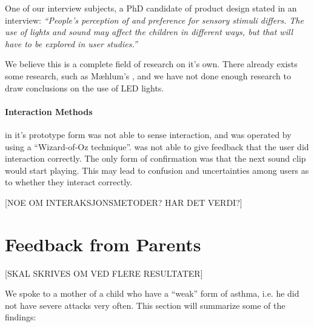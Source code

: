 One of our interview subjects, a PhD candidate of product design stated in an interview: 
\textit{``People's perception of and preference for sensory stimuli differs. The use of lights and sound may affect the children in different ways, but that will have to be explored in user studies.''} 

We believe this is a complete field of research on it's own. There already exists some research, such as M\ae hlum's \iref{}, and we have not done enough research to draw conclusions on the use of LED lights. 


\paragraph{Interaction Methods}
\buddy{} in it's prototype form was not able to sense interaction, and was operated by using a ``Wizard-of-Oz technique''\cite{wilson1988rapid}. \buddy{} was not able to give feedback that the user did interaction correctly. The only form of confirmation was that the next sound clip would start playing. This may lead to confusion and uncertainties among users as to whether they interact correctly. \iref{}

[NOE OM INTERAKSJONSMETODER? HAR DET VERDI?]

\section{Feedback from Parents}

[SKAL SKRIVES OM VED FLERE RESULTATER]

We spoke to a mother of a child who have a ``weak'' form of asthma, i.e. he did not have severe attacks very often. This section will summarize some of the findings: 

